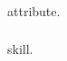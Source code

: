 \begin{tcbposter}
{  \subsubsection{}
  \par
  \vspace{1em}
  \subsubsection{}
  \glsdesc{attribute}.
  \par
  \vspace{1em}
  \subsubsection{}
  \glsdesc{skill}.
}

\end{tcbposter}


